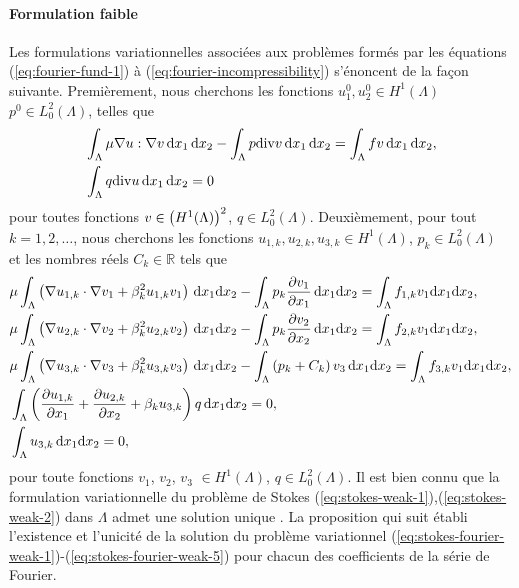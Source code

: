 \paragraph{Formulation faible}\label{sec:stokes-fourier-weak}
Les formulations variationnelles associées aux problèmes formés par
les équations (\ref{eq:fourier-fund-1}) à
(\ref{eq:fourier-incompressibility}) s'énoncent de la façon
suivante. Premièrement, nous cherchons les fonctions $u_1^0,u_2^0
\in H^1(\Lambda)$ $p^0 \in L^2_0(\Lambda)$, telles que
\begin{align}
&\int_\Lambda \mu \nabla u : \nabla v \,\mathrm dx_1\,\mathrm dx_2 -
\int_\Lambda p\mathrm{div} v \,\mathrm dx_1\,\mathrm dx_2 = \int_\Lambda f v
\,\mathrm dx_1\,\mathrm dx_2,\label{eq:stokes-weak-1}\\
&\int_\Lambda q\mathrm{div} u \,\mathrm dx_1\,\mathrm dx_2 = 0\label{eq:stokes-weak-2}
\end{align}
pour toutes fonctions $v \in \left( H^1(\Lambda) \right)^2$, $q \in
L_0^2(\Lambda)$. Deuxièmement, pour tout $k = 1, 2, \dots$, nous cherchons les
fonctions $u_{1,k},u_{2,k},u_{3,k} \in H^1(\Lambda)$, $p_k \in
L_0^2(\Lambda)$ et les nombres réels $C_k\in\mathbb R$ tels que
\begin{align}
  &\electrolyteviscosity \int_\Lambda \parent{\nabla u_{1,k}\cdot \nabla v_1 %
                           + \beta_k^2 u_{1,k}v_1}\,\mathrm dx_1\mathrm dx_2 %
  - \int_\Lambda p_k\frac{\partial v_1}{\partial x_1}\,\mathrm dx_1\mathrm dx_2 %
  = \int_\Lambda f_{1,k}v_1\mathrm dx_1\mathrm dx_2, \label{eq:stokes-fourier-weak-1}\\
  &\electrolyteviscosity \int_\Lambda \parent{\nabla u_{2,k}\cdot \nabla v_2 %
                           + \beta_k^2 u_{2,k}v_2}\,\mathrm dx_1\mathrm dx_2 %
  - \int_\Lambda p_k\frac{\partial v_2}{\partial x_2}\,\mathrm dx_1\mathrm dx_2 %
  = \int_\Lambda f_{2,k}v_1\mathrm dx_1\mathrm dx_2, \label{eq:stokes-fourier-weak-2}\\
  &\electrolyteviscosity \int_\Lambda \parent{\nabla u_{3,k}\cdot \nabla v_3 %
                           + \beta_k^2 u_{3,k}v_3}\,\mathrm dx_1\mathrm dx_2 %
  - \int_\Lambda \parent{p_k + C_k}v_3\,\mathrm dx_1\mathrm dx_2 %
  = \int_\Lambda f_{3,k}v_1\mathrm dx_1\mathrm dx_2, \label{eq:stokes-fourier-weak-3}\\
  &\int_\Lambda \parent{\frac{\partial u_{1,k}}{\partial x_1} %
                       + \frac{\partial u_{2,k}}{\partial x_2} + \beta_k u_{3,k}}q\,\mathrm dx_1\mathrm dx_2 %
  = 0,\label{eq:stokes-fourier-weak-4}\\
  &\int_\Lambda u_{3,k}\,\mathrm dx_1\mathrm dx_2 %
  = 0, \label{eq:stokes-fourier-weak-5}
\end{align}
pour toute fonctions $v_1$, $v_2$, $v_3$ $\in H^1(\Lambda)$, $q \in
L_0^2(\Lambda)$. Il est bien connu que la formulation variationnelle
du problème de Stokes
(\ref{eq:stokes-weak-1}),(\ref{eq:stokes-weak-2}) dans $\Lambda$ admet
une solution unique \cite{Temam1977}. La proposition qui suit établi l'existence et
l'unicité de la solution du problème variationnel
(\ref{eq:stokes-fourier-weak-1})-(\ref{eq:stokes-fourier-weak-5}) pour
chacun des coefficients de la série de Fourier.

